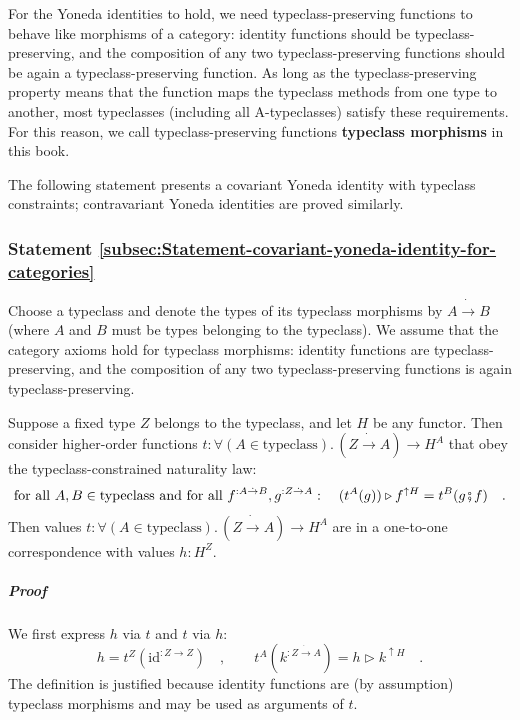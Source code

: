For the Yoneda identities to hold, we need typeclass-preserving functions
to behave like morphisms of a category: identity functions should
be typeclass-preserving, and the composition of any two typeclass-preserving
functions should be again a typeclass-preserving function. As long
as the typeclass-preserving property means that the function maps
the typeclass methods from one type to another, most typeclasses (including
all A-typeclasses) satisfy these requirements. For this reason, we
call typeclass-preserving functions \textbf{typeclass morphisms}
in this book.

The following statement presents a covariant Yoneda identity with
typeclass constraints; contravariant Yoneda identities are proved
similarly.

\subsubsection{Statement \label{subsec:Statement-covariant-yoneda-identity-for-categories}\ref{subsec:Statement-covariant-yoneda-identity-for-categories}
}

Choose a typeclass and denote the types of its typeclass morphisms
by $A\dot{\rightarrow}B$ (where $A$ and $B$ must be types belonging
to the typeclass). We assume that the category axioms hold for typeclass
morphisms: identity functions are typeclass-preserving, and the composition
of any two typeclass-preserving functions is again typeclass-preserving. 

Suppose a fixed type $Z$ belongs to the typeclass, and let $H$ be
any functor. Then consider higher-order functions $t:\forall(A\in\text{typeclass}).\,(Z\dot{\rightarrow}A)\rightarrow H^{A}$
that obey the typeclass-constrained naturality law:
\begin{equation}
\text{for all }A,B\in\text{typeclass and for all }f^{:A\dot{\rightarrow}B},g^{:Z\dot{\rightarrow}A}:\quad(t^{A}(g))\triangleright f^{\uparrow H}=t^{B}(g\bef f)\quad.\label{eq:naturality-law-typeclass}
\end{equation}
Then values $t:\forall(A\in\text{typeclass}).\,(Z\dot{\rightarrow}A)\rightarrow H^{A}$
are in a one-to-one correspondence with values $h:H^{Z}$. 

\subparagraph{Proof}

We first express $h$ via $t$ and $t$ via $h$:
\[
h=t^{Z}(\text{id}^{:Z\rightarrow Z})\quad,\quad\quad t^{A}(k^{:Z\dot{\rightarrow}A})=h\triangleright k^{\uparrow H}\quad.
\]
 The definition is justified because identity functions are (by assumption)
typeclass morphisms and may be used as arguments of $t$. 

